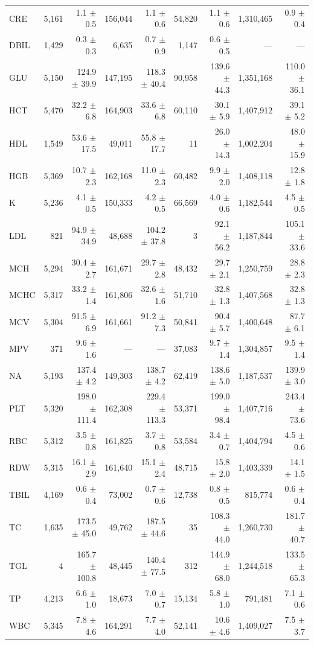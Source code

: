 \begin{table}[ht]
\begin{tabular}{lrrrrrrrr}
CRE & 5,161 & 1.1 $\pm$ 0.5 & 156,044 & 1.1 $\pm$ 0.6 & 54,820 & 1.1 $\pm$ 0.6 & 1,310,465 & 0.9 $\pm$ 0.4 \\
DBIL & 1,429 & 0.3 $\pm$ 0.3 & 6,635 & 0.7 $\pm$ 0.9 & 1,147 & 0.6 $\pm$ 0.5 & --- & --- \\
GLU & 5,150 & 124.9 $\pm$ 39.9 & 147,195 & 118.3 $\pm$ 40.4 & 90,958 & 139.6 $\pm$ 44.3 & 1,351,168 & 110.0 $\pm$ 36.1 \\
HCT & 5,470 & 32.2 $\pm$ 6.8 & 164,903 & 33.6 $\pm$ 6.8 & 60,110 & 30.1 $\pm$ 5.9 & 1,407,912 & 39.1 $\pm$ 5.2 \\
HDL & 1,549 & 53.6 $\pm$ 17.5 & 49,011 & 55.8 $\pm$ 17.7 & 11 & 26.0 $\pm$ 14.3 & 1,002,204 & 48.0 $\pm$ 15.9 \\
HGB & 5,369 & 10.7 $\pm$ 2.3 & 162,168 & 11.0 $\pm$ 2.3 & 60,482 & 9.9 $\pm$ 2.0 & 1,408,118 & 12.8 $\pm$ 1.8 \\
K & 5,236 & 4.1 $\pm$ 0.5 & 150,333 & 4.2 $\pm$ 0.5 & 66,569 & 4.0 $\pm$ 0.6 & 1,182,544 & 4.5 $\pm$ 0.5 \\
LDL & 821 & 94.9 $\pm$ 34.9 & 48,688 & 104.2 $\pm$ 37.8 & 3 & 92.1 $\pm$ 56.2 & 1,187,844 & 105.1 $\pm$ 33.6 \\
MCH & 5,294 & 30.4 $\pm$ 2.7 & 161,671 & 29.7 $\pm$ 2.8 & 48,432 & 29.7 $\pm$ 2.1 & 1,250,759 & 28.8 $\pm$ 2.3 \\
MCHC & 5,317 & 33.2 $\pm$ 1.4 & 161,806 & 32.6 $\pm$ 1.6 & 51,710 & 32.8 $\pm$ 1.3 & 1,407,568 & 32.8 $\pm$ 1.3 \\
MCV & 5,304 & 91.5 $\pm$ 6.9 & 161,661 & 91.2 $\pm$ 7.3 & 50,841 & 90.4 $\pm$ 5.7 & 1,400,648 & 87.7 $\pm$ 6.1 \\
MPV & 371 & 9.6 $\pm$ 1.6 & --- & --- & 37,083 & 9.7 $\pm$ 1.4 & 1,304,857 & 9.5 $\pm$ 1.4 \\
NA & 5,193 & 137.4 $\pm$ 4.2 & 149,303 & 138.7 $\pm$ 4.2 & 62,419 & 138.6 $\pm$ 5.0 & 1,187,537 & 139.9 $\pm$ 3.0 \\
PLT & 5,320 & 198.0 $\pm$ 111.4 & 162,308 & 229.4 $\pm$ 113.3 & 53,371 & 199.0 $\pm$ 98.4 & 1,407,716 & 243.4 $\pm$ 73.6 \\
RBC & 5,312 & 3.5 $\pm$ 0.8 & 161,825 & 3.7 $\pm$ 0.8 & 53,584 & 3.4 $\pm$ 0.7 & 1,404,794 & 4.5 $\pm$ 0.6 \\
RDW & 5,315 & 16.1 $\pm$ 2.9 & 161,640 & 15.1 $\pm$ 2.4 & 48,715 & 15.8 $\pm$ 2.0 & 1,403,339 & 14.1 $\pm$ 1.5 \\
TBIL & 4,169 & 0.6 $\pm$ 0.4 & 73,002 & 0.7 $\pm$ 0.6 & 12,738 & 0.8 $\pm$ 0.5 & 815,774 & 0.6 $\pm$ 0.4 \\
TC & 1,635 & 173.5 $\pm$ 45.0 & 49,762 & 187.5 $\pm$ 44.6 & 35 & 108.3 $\pm$ 44.0 & 1,260,730 & 181.7 $\pm$ 40.7 \\
TGL & 4 & 165.7 $\pm$ 100.8 & 48,445 & 140.4 $\pm$ 77.5 & 312 & 144.9 $\pm$ 68.0 & 1,244,518 & 133.5 $\pm$ 65.3 \\
TP & 4,213 & 6.6 $\pm$ 1.0 & 18,673 & 7.0 $\pm$ 0.7 & 15,134 & 5.8 $\pm$ 1.0 & 791,481 & 7.1 $\pm$ 0.6 \\
WBC & 5,345 & 7.8 $\pm$ 4.6 & 164,291 & 7.7 $\pm$ 4.0 & 52,141 & 10.6 $\pm$ 4.6 & 1,409,027 & 7.5 $\pm$ 3.7 \\
\bottomrule
\end{tabular}
\label{tab:cohort}
\end{table}